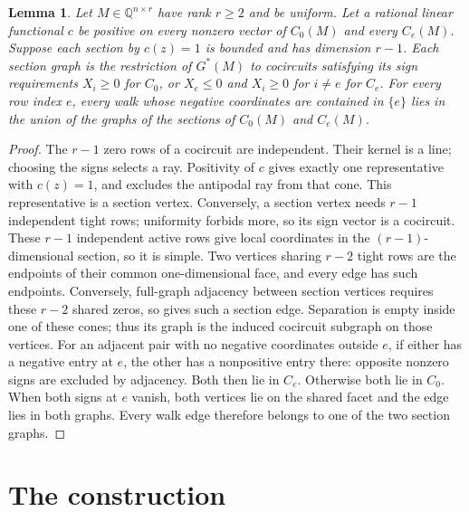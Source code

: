 \documentclass[11pt]{article}
\newtheorem{lemma}[theorem]{Lemma}
\theoremstyle{remark}
\newcommand{\Q}{\mathbb Q}
\begin{document}
\begin{lemma}\label{lem:cells}
Let $M\in\Q^{n\times r}$ have rank $r\ge2$ and be uniform. Let a rational
linear functional $c$ be positive on every nonzero vector of $C_0(M)$
and every $C_e(M)$. Suppose each section by $c(z)=1$ is bounded
and has dimension $r-1$.
Each section graph is the restriction of $G^*(M)$ to cocircuits satisfying its
sign requirements $X_i\ge0$ for $C_0$, or $X_e\le0$ and $X_i\ge0$
for $i\ne e$ for $C_e$. For every row index $e$, every walk whose negative coordinates
are contained in $\{e\}$ lies in the union of the graphs of the sections
of $C_0(M)$ and $C_e(M)$.
\end{lemma}
\begin{proof}
The $r-1$ zero rows of a cocircuit are independent. Their kernel is a line;
choosing the signs selects a ray. Positivity of $c$ gives exactly one
representative with $c(z)=1$, and excludes the antipodal ray from that cone.
This representative is a section vertex.
Conversely, a section vertex needs $r-1$ independent
tight rows; uniformity forbids more, so its sign vector is a cocircuit.
These $r-1$ independent active rows give local coordinates in the
$(r-1)$-dimensional section, so it is simple. Two vertices sharing $r-2$ tight rows
are the endpoints of their common one-dimensional face, and every edge
has such endpoints. Conversely, full-graph adjacency between section
vertices requires these $r-2$ shared zeros, so gives such a section edge.
Separation is empty inside one of these cones; thus its
graph is the induced cocircuit subgraph on those vertices.
For an adjacent pair with no negative coordinates outside $e$, if either
has a negative entry at $e$, the other has a nonpositive entry there:
opposite nonzero signs are excluded by adjacency. Both then lie in $C_e$.
Otherwise both lie in $C_0$. When both signs at $e$ vanish, both vertices lie on the shared facet
and the edge lies in both graphs. Every walk edge therefore belongs to
one of the two section graphs.
\end{proof}

\section{The construction}
\end{document}
